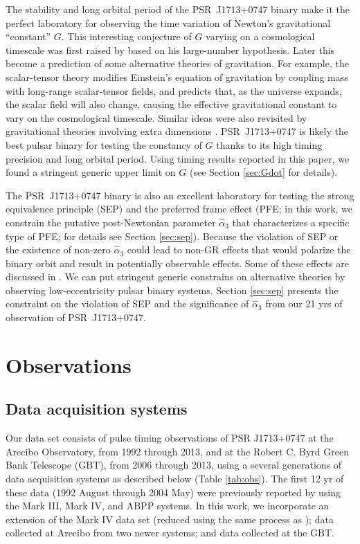 The stability and long orbital period of the PSR~J1713+0747 binary make it the
perfect laboratory for observing the time variation of Newton's gravitational ``constant'' $G$. 
This interesting conjecture of $G$ varying on a cosmological timescale was first 
raised by \citet{dir37} based on his large-number hypothesis. 
Later this become a prediction of some alternative theories of gravitation. 
For example, the scalar-tensor theory \citep{jor55,jor59,fie56,bd61} 
modifies Einstein's equation of gravitation by coupling mass with
long-range scalar-tensor fields, and predicts that, as the universe expands,
the scalar field will also change, causing the effective gravitational constant to vary  
on the cosmological timescale. 
Similar ideas were also revisited by gravitational theories involving extra dimensions
\citep{mar84,ww86a}.
PSR~J1713+0747 is likely the best pulsar binary for testing the constancy of
$G$ thanks to its high timing precision and long orbital period. Using timing
results reported in this paper, we found a stringent generic upper limit on 
$\dot{G}$ (see Section \ref{sec:Gdot} for details). 

The PSR~J1713+0747 binary is also an excellent laboratory for testing 
the strong equivalence principle (SEP) and the preferred
frame effect (PFE; in this work, we constrain the putative post-Newtonian
parameter $\hat{\alpha}_3$ that characterizes a specific type of PFE; for
details see Section \ref{sec:sep}). 
Because the violation of SEP or the existence of non-zero $\hat{\alpha}_3$
could lead to non-GR effects that would polarize the
binary orbit and result in potentially observable effects. Some of these
effects are discussed in \citep{fkw12, will14}. We can put stringent generic
constrains on alternative theories by observing
low-eccentricity pulsar binary systems. Section \ref{sec:sep} presents the
constraint on the violation of SEP and the significance of $\hat{\alpha}_3$ from our 21 yrs of observation of PSR~J1713+0747.

\section{Observations}
\subsection{Data acquisition systems}


Our data set consists of pulse timing observations of PSR J1713+0747 at the
Arecibo Observatory, from 1992 through 2013, and at the Robert C. Byrd Green Bank
Telescope (GBT), from 2006 through 2013, using a several generations of
data acquisition systems as described below (Table \ref{tab:obs}).  The first 12 yr of
these data (1992 August through 2004 May) were previously reported by
\citet{sns+05} using the Mark III, Mark IV, and ABPP systems.  In
this work, we incorporate an extension of the Mark IV data set (reduced
using the same process as \citealt{sns+05}); data collected at Arecibo
from two newer systems; and data collected at the GBT.

